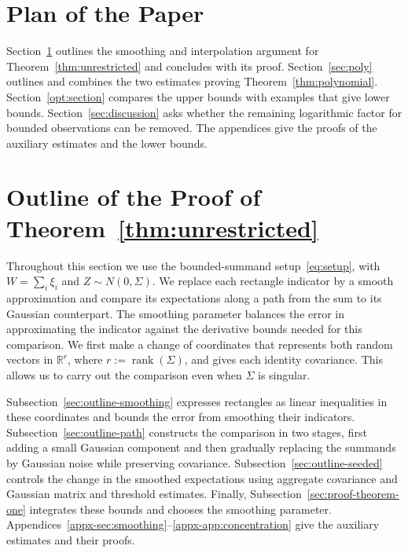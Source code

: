 \documentclass[11pt,letterpaper]{article}
\newenvironment{recovered}{\color{magenta}}{}
\theoremstyle{remark}
\newcommand{\R}{\mathbb R}
\begin{document}
\section*{Plan of the Paper}
Section~\ref{sec:smoothing} outlines the smoothing and interpolation
argument for Theorem~\ref{thm:unrestricted} and concludes with its proof.
Section~\ref{sec:poly} outlines and combines the two estimates proving
Theorem~\ref{thm:polynomial}.
Section~\ref{opt:section} compares the upper bounds with examples that
give lower bounds. Section~\ref{sec:discussion} asks whether the remaining
logarithmic factor for bounded observations can be removed. The appendices
give the proofs of the auxiliary estimates and the lower bounds.

\section{Outline of the Proof of Theorem~\ref*{thm:unrestricted}}\label{sec:smoothing}
Throughout this section we use the bounded-summand setup~\eqref{eq:setup},
with \(W=\sum_i\xi_i\) and \(Z\sim N(0,\Sigma)\).
We replace each rectangle indicator by a smooth approximation and compare
its expectations along a path from the sum to its Gaussian counterpart.
The smoothing parameter balances the error in approximating the indicator
against the derivative bounds needed for this comparison.
We first make a change of coordinates that represents both random vectors
in \(\R^r\), where \(r:=\operatorname{rank}(\Sigma)\), and gives each
identity covariance. This allows us to carry out the comparison even
when \(\Sigma\) is singular.

\begin{recovered}
Subsection~\ref{sec:outline-smoothing} expresses rectangles as linear
inequalities in these coordinates and bounds the error from smoothing
their indicators. Subsection~\ref{sec:outline-path} constructs the
comparison in two stages, first adding a small Gaussian component and
then gradually replacing the summands by Gaussian noise while preserving
covariance. Subsection~\ref{sec:outline-seeded} controls the change in
the smoothed expectations using aggregate covariance and Gaussian matrix
and threshold estimates. Finally, Subsection~\ref{sec:proof-theorem-one}
integrates these bounds and chooses the smoothing parameter.
Appendices~\ref{appx-sec:smoothing}--\ref{appx-app:concentration}
give the auxiliary estimates and their proofs.
\end{recovered}
\end{document}
